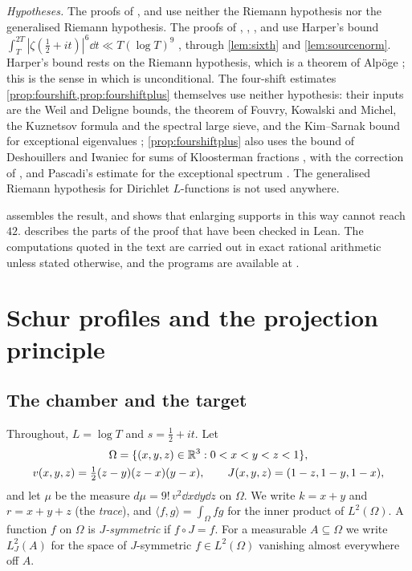 \documentclass[11pt,colorlinks]{charlie}
\newcommand{\Om}{\Omega}
\newcommand{\ip}[2]{\langle #1,#2\rangle}
\begin{document}
\emph{Hypotheses.} The proofs of ,  and  use neither the Riemann hypothesis nor the generalised Riemann hypothesis. The proofs of , , ,  and  use Harper's bound $\int_T^{2T}|\zeta(\frac12+it)|^6\dd t\ll T(\log T)^9$ \cite{Harper}, through \cref{lem:sixth} and \cref{lem:sourcenorm}. Harper's bound rests on the Riemann hypothesis, which is a theorem of Alp\"oge \cite{Alpoge}; this is the sense in which  is unconditional. The four-shift estimates \cref{prop:fourshift,prop:fourshiftplus} themselves use neither hypothesis: their inputs are the Weil and Deligne bounds, the theorem of Fouvry, Kowalski and Michel, the Kuznetsov formula and the spectral large sieve, and the Kim--Sarnak bound for exceptional eigenvalues \cite{KimSarnak}; \cref{prop:fourshiftplus} also uses the bound of Deshouillers and Iwaniec for sums of Kloosterman fractions \cite[Theorem~12]{DI}, with the correction of \cite{Lichtman}, and Pascadi's estimate for the exceptional spectrum \cite{Pascadi}. The generalised Riemann hypothesis for Dirichlet $L$-functions is not used anywhere.

 assembles the result, and  shows that enlarging supports in this way cannot reach $42$.  describes the parts of the proof that have been checked in Lean. The computations quoted in the text are carried out in exact rational arithmetic unless stated otherwise, and the programs are available at \coderepo.

\section{Schur profiles and the projection principle}\label{sec:schur}

\subsection{The chamber and the target}
Throughout, $L=\log T$ and $s=\tfrac12+it$. Let
\begin{gather*}
 \Om=\{(x,y,z)\in\R^3:0<x<y<z<1\},\\ v(x,y,z)=\tfrac12(z-y)(z-x)(y-x),\qquad J(x,y,z)=(1-z,1-y,1-x),
\end{gather*}
and let $\mu$ be the measure $d\mu=9!\,v^2\dd x\dd y\dd z$ on $\Om$. We write $k=x+y$ and $r=x+y+z$ (the \emph{trace}), and $\ip fg=\int_\Om fg$ for the inner product of $L^2(\Om)$. A function $f$ on $\Om$ is \emph{$J$-symmetric} if $f\circ J=f$. For a measurable $A\subseteq\Om$ we write $L^2_J(A)$ for the space of $J$-symmetric $f\in L^2(\Om)$ vanishing almost everywhere off $A$.
\end{document}
